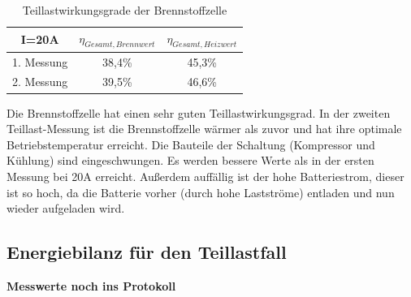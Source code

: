 \begin{table}[H]
    \caption{Teillastwirkungsgrade der Brennstoffzelle}
    \centering
        \begin{tabular}[pos]{|c|c|c|}
            \hline
            \rowcolor[HTML]{70AD47} 
            I=20A   & $\eta_{Gesamt,Brennwert}$               & $\eta_{Gesamt,Heizwert}$   \\\hline\hline
            1. Messung  & 38,4\%                            & 45,3\%                            \\ \hline
            2. Messung  & 39,5\%                            & 46,6\%                            \\\hline
        \end{tabular}
        \label{tab:20230628_Teillastwirkungsgrade}
\end{table}


Die Brennstoffzelle hat einen sehr guten Teillastwirkungsgrad. In der zweiten Teillast-Messung ist die Brennstoffzelle wärmer als zuvor und hat ihre optimale Betriebstemperatur erreicht. Die Bauteile der Schaltung (Kompressor und Kühlung) sind eingeschwungen. Es werden bessere Werte als in der ersten Messung bei 20A erreicht. Außerdem auffällig ist der hohe Batteriestrom, dieser ist so hoch, da die Batterie vorher (durch hohe Lastströme) entladen und nun wieder aufgeladen wird. 



\subsection{Energiebilanz für den Teillastfall}

\textbf{Messwerte noch ins Protokoll}